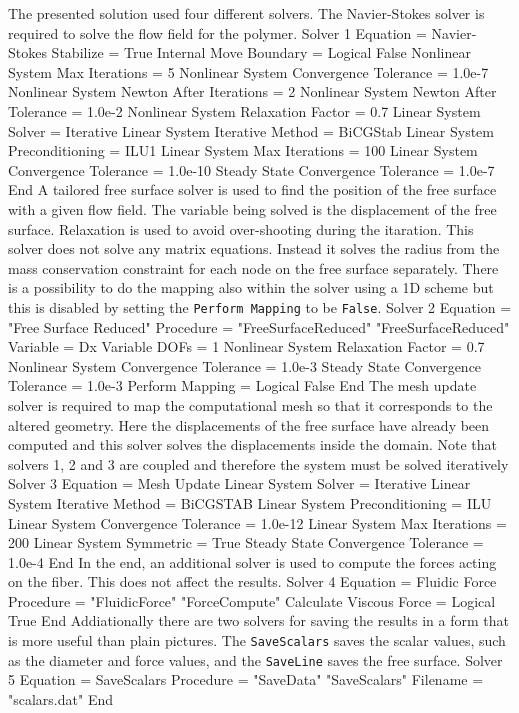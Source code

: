 The presented solution used four different solvers. 
The Navier-Stokes solver is required to solve the flow field
for the polymer.
\ttbegin
Solver 1
  Equation = Navier-Stokes
  Stabilize = True
  Internal Move Boundary = Logical False
  Nonlinear System Max Iterations = 5
  Nonlinear System Convergence Tolerance = 1.0e-7
  Nonlinear System Newton After Iterations = 2
  Nonlinear System Newton After Tolerance = 1.0e-2
  Nonlinear System Relaxation Factor = 0.7
  Linear System Solver = Iterative
  Linear System Iterative Method = BiCGStab 
  Linear System Preconditioning = ILU1
  Linear System Max Iterations = 100
  Linear System Convergence Tolerance = 1.0e-10
  Steady State Convergence Tolerance = 1.0e-7
End
\ttend
%
A tailored free surface solver is used to find the 
position of the free surface with a given flow field.
The variable being solved is the displacement of the free surface.
Relaxation is used to avoid over-shooting during the itaration.
This solver does not solve any matrix equations. Instead it solves
the radius from the mass conservation constraint for each node on the
free surface separately. There is a possibility to do the mapping also 
within the solver using a 1D scheme but this is disabled by setting
the \texttt{Perform Mapping} to be \texttt{False}.
\ttbegin
Solver 2
  Equation = "Free Surface Reduced"
  Procedure = "FreeSurfaceReduced" "FreeSurfaceReduced"
  Variable = Dx
  Variable DOFs = 1
  Nonlinear System Relaxation Factor = 0.7
  Nonlinear System Convergence Tolerance = 1.0e-3
  Steady State Convergence Tolerance = 1.0e-3
  Perform Mapping = Logical False
End
\ttend
%
The mesh update solver is required to map the computational mesh
so that it corresponds to the altered geometry.
Here the displacements of the free surface have already been computed
and this solver solves the displacements inside the domain.
Note that solvers 1, 2 and 3 are coupled and therefore the system must be solved iteratively
\ttbegin
Solver 3
  Equation = Mesh Update
  Linear System Solver = Iterative 
  Linear System Iterative Method = BiCGSTAB
  Linear System Preconditioning = ILU
  Linear System Convergence Tolerance = 1.0e-12
  Linear System Max Iterations = 200
  Linear System Symmetric = True
  Steady State Convergence Tolerance = 1.0e-4
End
\ttend
%
In the end, an additional solver is used to compute the forces
acting on the fiber. This does not affect the results.
\ttbegin
Solver 4 
  Equation = Fluidic Force
  Procedure = "FluidicForce" "ForceCompute"
  Calculate Viscous Force = Logical True
End
\ttend
%
Addiationally there are two solvers for saving the results in a form
that is more useful than plain pictures. The \texttt{SaveScalars} saves
the scalar values, such as the diameter and force values,
and the \texttt{SaveLine} saves the free surface.
\ttbegin
Solver 5
  Equation = SaveScalars
  Procedure = "SaveData" "SaveScalars"
  Filename = "scalars.dat"
End 

